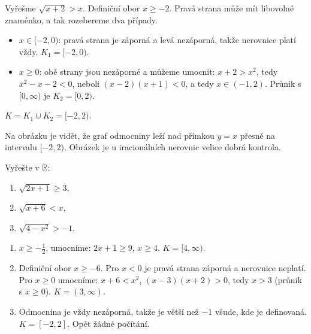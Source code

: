 \begin{example}
  Vyřešme $\sqrt{x + 2} > x$. Definiční obor $x\geq -2$. Pravá strana může mít libovolné znaménko, a tak rozebereme dva případy.
  \begin{itemize}
    \item $x\in[-2, 0)$: pravá strana je záporná a levá nezáporná, takže nerovnice platí vždy. $K_1 = [-2, 0)$.
    \item $x\geq 0$: obě strany jsou nezáporné a můžeme umocnit: $x + 2 > x^2$, tedy $x^2 - x - 2 < 0$, neboli $(x - 2)(x + 1) < 0$, a tedy $x\in(-1, 2)$. Průnik s $[0, \infty)$ je $K_2 = [0, 2)$.
  \end{itemize}
  $K = K_1\cup K_2 = [-2, 2)$.
\end{example}

\begin{center}
\end{center}

Na obrázku je vidět, že graf odmocniny leží nad přímkou $y = x$ přesně na intervalu $[-2, 2)$. Obrázek je u iracionálních nerovnic velice dobrá kontrola.

\begin{problem}
  Vyřešte v $\mathbb{R}$:
  \begin{enumerate}[label=(\alph*)]
    \item $\sqrt{2x + 1}\geq 3$,
    \item $\sqrt{x + 6} < x$,
    \item $\sqrt{4 - x^2} > -1$.
  \end{enumerate}
\end{problem}

\begin{solution}
  \begin{enumerate}[label=(\alph*)]
    \item $x\geq -\frac{1}{2}$, umocníme: $2x + 1\geq 9$, $x\geq 4$. $K = [4, \infty)$.
    \item Definiční obor $x\geq -6$. Pro $x < 0$ je pravá strana záporná a nerovnice neplatí. Pro $x\geq 0$ umocníme: $x + 6 < x^2$, $(x - 3)(x + 2) > 0$, tedy $x > 3$ (průnik s $x\geq 0$). $K = (3, \infty)$.
    \item Odmocnina je vždy nezáporná, takže je větší než $-1$ všude, kde je definovaná. $K = [-2, 2]$. Opět žádné počítání.
  \end{enumerate}
\end{solution}

